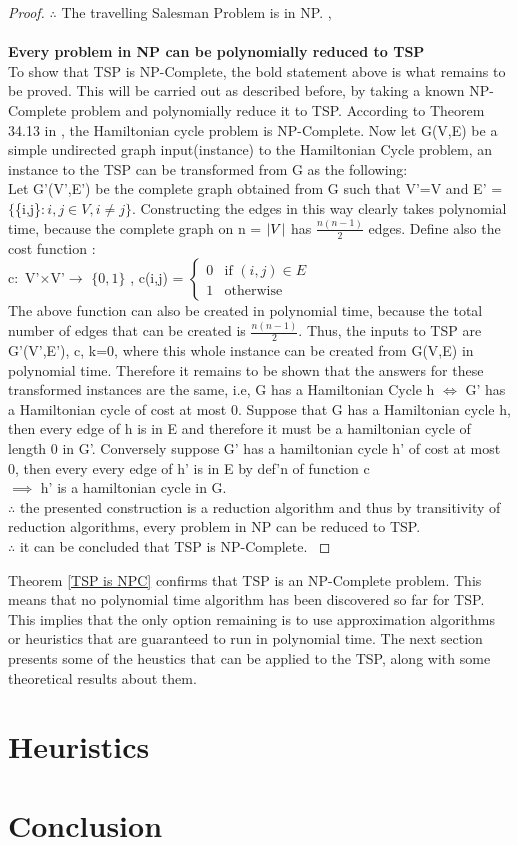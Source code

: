 \documentclass{article}
\begin{document}
\begin{proof}
$\therefore$ The travelling Salesman Problem is in NP. \cite{cormen_leiserson_rivest_stein}, \cite{rowell}\\
\\
\textbf{Every problem in NP can be polynomially reduced to TSP}\\
To show that TSP is NP-Complete, the bold statement above is what remains to be proved. This will be carried out as described before, by taking a known NP-Complete problem and polynomially reduce it to TSP. According to Theorem 34.13 in \cite{cormen_leiserson_rivest_stein}, the Hamiltonian cycle problem is NP-Complete. Now let G(V,E) be a simple undirected graph input(instance) to the Hamiltonian Cycle problem, an instance to the TSP can be transformed from G as the following:\\
Let G'(V',E') be the complete graph obtained from G such that V'=V and E' = $\{$\{i,j\}$ : i,j \in V , i \ne j \}$. Constructing the edges in this way clearly takes polynomial time, because the complete graph on n = $\abs{V}$ has $\frac{n(n-1)}{2}$ edges. Define also the cost function :\\
c$\colon$ V'$\times$V'$\to$ $\{0,1\}$ , c(i,j) = $\begin{cases} 0& \text{if } (i,j) \in E\\ 1              & \text{otherwise} \end{cases}$\\
The above function can also be created in polynomial time, because the total number of edges that can be created is $\frac{n(n-1)}{2}$. Thus, the inputs to TSP are G'(V',E'), c, k=0, where this whole instance can be created from G(V,E) in polynomial time. Therefore it remains to be shown that the answers for these transformed instances are the same, i.e, G has a Hamiltonian Cycle h $\iff$ G' has a Hamiltonian cycle of cost at most 0. Suppose that G has a Hamiltonian cycle h, then every edge of h is in E and therefore it must be a hamiltonian cycle of length 0 in G'. Conversely suppose G' has a hamiltonian cycle h' of cost at most 0, then every every edge of h' is in E by def'n of function c\\
$\implies$ h' is a hamiltonian cycle in G.\\
$\therefore$ the presented construction is a reduction algorithm and thus by transitivity of reduction algorithms, every problem in NP can be reduced to TSP.\\
$\therefore$ it can be concluded that TSP is NP-Complete. \cite{cormen_leiserson_rivest_stein}
\end{proof}
Theorem \ref{TSP is NPC} confirms that TSP is an NP-Complete problem. This means that no polynomial time algorithm has been discovered so far for TSP. This implies that the only option remaining is to use approximation algorithms or heuristics that are guaranteed to run in polynomial time. The next section presents some of the heustics that can be applied to the TSP, along with some theoretical results about them.
\newpage
\section{Heuristics}
\newpage
\section{Conclusion}
\newpage


\end{document}
